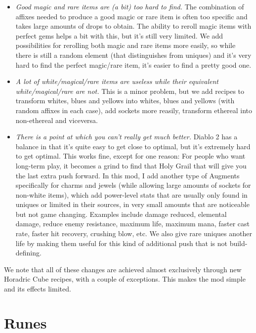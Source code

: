 \documentclass[12pt,a4paper]{article}
\begin{document}
\begin{itemize}
\item {\emph{Good magic and rare items are (a bit) too hard to find.}} The combination of affixes needed to produce a good magic or rare item is often too specific and takes large amounts of drops to obtain. The ability to reroll magic items with perfect gems helps a bit with this, but it's still very limited. We add possibilities for rerolling both magic and rare items more easily, so while there is still a random element (that distinguishes from uniques) and it's very hard to find the perfect magic/rare item, it's easier to find a pretty good one.

\item {\emph{A lot of white/magical/rare items are useless while their equivalent white/magical/rare are not.}} This is a minor problem, but we add recipes to transform whites, blues and yellows into whites, blues and yellows (with random affixes in each case), add sockets more reasily, transform ethereal into non-ethereal and viceversa.

\item {\emph{There is a point at which you can't really get much better.}} Diablo 2 has a balance in that it's quite easy to get close to optimal, but it's extremely hard to get optimal. This works fine, except for one reason: For people who want long-term play, it becomes a grind to find that Holy Grail that will give you the last extra push forward. In this mod, I add another type of Augments specifically for charms and jewels (while allowing large amounts of sockets for non-white items), which add power-level stats that are usually only found in uniques or limited in their sources, in very small amounts that are noticeable but not game changing. Examples include damage reduced, elemental damage, reduce enemy resistance, maximum life, maximum mana, faster cast rate, faster hit recovery, crushing blow, etc. We also give rare uniques another life by making them useful for this kind of additional push that is not build-defining.

\end{itemize}

We note that all of these changes are achieved almost exclusively through new Horadric Cube recipes, with a couple of exceptions. This makes the mod simple and its effects limited.

\section{Runes}
\end{document}
